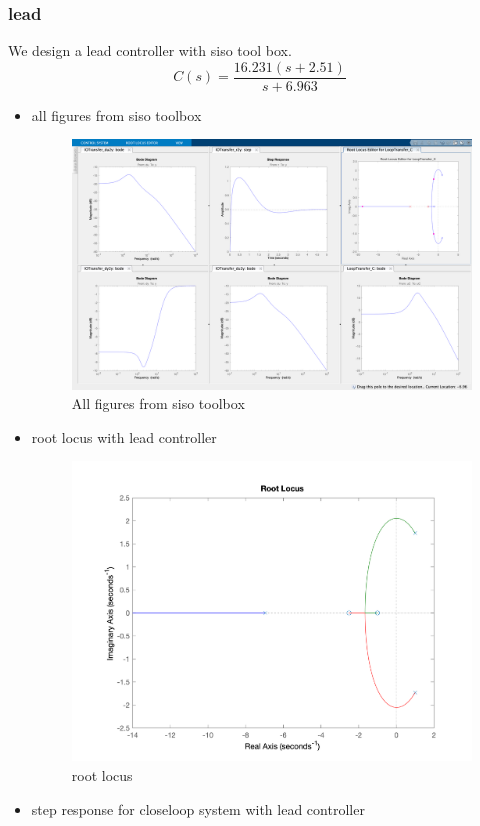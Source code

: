 \subsubsection{lead}
We design a lead controller with siso tool box.
$$
C(s) = \dfrac{16.231(s + 2.51)}{s + 6.963}
$$
\begin{itemize}
	\item all figures from siso toolbox
	\begin{figure}[H]
		\caption{All figures from siso toolbox}
		\centering
		\includegraphics[width=16cm]{../Figure/Q1/Q1_b/lead/siso_all.png}
	\end{figure}
	\newpage
	\item root locus with lead controller
	\begin{figure}[H]
		\caption{root locus}
		\centering
		\includegraphics[width=12cm]{../Figure/Q1/Q1_b/lead/rlocus.png}
	\end{figure}
	\item step response for closeloop system with lead controller

\end{itemize}
